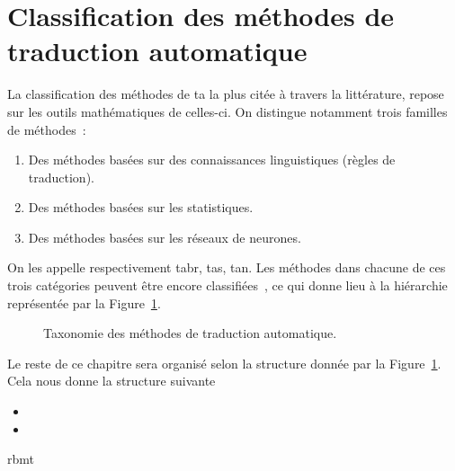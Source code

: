 \section{Classification des méthodes de traduction automatique}

La classification des méthodes de \acrshort{ta} la plus citée à travers la littérature, 
repose sur les outils mathématiques de celles-ci.
On distingue notamment trois familles de méthodes~\cite{deep-nmt-survey}:
\begin{enumerate}
    \item Des méthodes basées sur des connaissances linguistiques (règles de traduction).
    \item Des méthodes basées sur les statistiques.
    \item Des méthodes basées sur les réseaux de neurones.
\end{enumerate}

On les appelle respectivement \Acrfull{tabr}, \Acrfull{tas}, \Acrfull{tan}.
Les méthodes dans chacune de ces trois catégories peuvent être encore classifiées~\cite{deep-nmt-survey,hybrid-mt},
ce qui donne lieu à la hiérarchie représentée par la Figure~\ref{fig:mt-taxonomy-tree}.

\begin{figure}
    \begin{center}
       \resizebox{\textwidth}{!}{
         
       }
    \end{center}
    
    \caption{Taxonomie des méthodes de traduction automatique.}
    \label{fig:mt-taxonomy-tree}
\end{figure}

Le reste de ce chapitre sera organisé selon la structure donnée par la Figure~\ref{fig:mt-taxonomy-tree}. 
Cela nous donne la structure suivante

\begin{itemize}
    \item {}
    \item {}
\end{itemize}

{rbmt}
